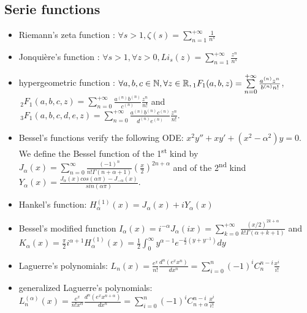 \subsection{Serie functions}
\begin{itemize}
\item Riemann's zeta function : $\forall s>1, \zeta(s) = \sum\limits_{n=1}^{+\infty}\frac{1}{n^s}$
\item Jonqui\`ere's function : $\forall s>1, \forall z >0, Li_s(z)= \sum\limits_{n=1}^{+\infty}\frac{z^n}{n^s}$
\item hypergeometric function : $\forall a,b,c\in \mathbb{N}, \forall z\in \mathbb{R}, {}_1F_1(a,b,z)= \sum\limits_{n=0}^{+\infty} \frac {a^{(n)} z^n} {b^{(n)} n!}$, $\,_2F_1 (a,b,c,z) = \sum\limits_{n=0}^{+\infty} \frac{a^{(n)} b^{(n)}}{c^{(n)}}  \frac {z^n} {n!}$ and $\,_3F_1 (a,b,c,d,e,z) = \sum\limits_{n=0}^{+\infty} \frac{a^{(n)} b^{(n)}c^{(n)}}{d^{(n)}e^{(n)}}  \frac {z^n} {n!}$.

\item Bessel's functions verify the following ODE: $x^2y''+xy'+(x^2-\alpha^2)y=0$. We define the Bessel function of the 1\textsuperscript{st} kind by
$J_\alpha(x) = \sum\limits_{n=0}^\infty \frac{(-1)^n}{n!\Gamma(n+\alpha+1)}\left(\frac{x}{2}\right)^{2n+\alpha}$
 and of the  2\textsuperscript{nd} kind 
 $Y_\alpha(x) = \frac{J_\alpha(x)cos(\alpha\pi)-J_{-\alpha}(x)}{sin(\alpha\pi)}$.
\item Hankel's function: $H_\alpha^{(1)}(x) = J_\alpha(x)+i Y_\alpha(x)$
\item Bessel's modified function $I_\alpha(x) = i^{-\alpha} J_\alpha(ix) = \sum\limits_{k=0}^{+\infty}\frac{(x/2)^{2k+\alpha}}{k!\Gamma(\alpha+k+1)}$ and 
$K_\alpha(x) = \frac{\pi}{2}i^{\alpha+1} H_\alpha^{(1)}(x) = \frac{1}{2}\int_0^\infty y^{\alpha-1} e^{-\frac{x}{2}(y+y^{-1})}dy$
\item Laguerre's polynomials: $L_n (x) =\frac{e^x}{n!}\frac{d^n(e^x x^n)}{dx^n} =  \sum_{i=0}^n (-1)^i C_{n}^{n-i} \frac{x^i}{i!}$
\item generalized Laguerre's polynomials: $L_n^{(\alpha)} (x) =\frac{e^x}{n!x^\alpha}\frac{d^n(e^x x^{n+\alpha})}{dx^n} =  \sum_{i=0}^n (-1)^i C_{n+\alpha}^{n-i} \frac{x^i}{i!}$
\end{itemize}

